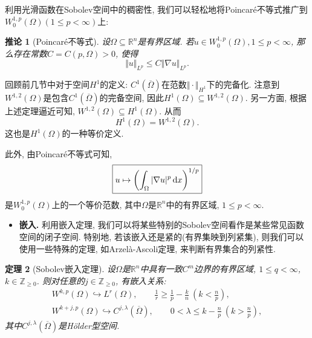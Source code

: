 \documentclass[12pt,a4paper]{article}
\newtheorem{theorem}{定理}[section]
\newtheorem{corollary}[theorem]{推论}
\begin{document}
利用光滑函数在Sobolev空间中的稠密性, 我们可以轻松地将Poincar\'e不等式推广到$W_0^{1, p}(\Omega) (1 \leq p < \infty)$上:

\begin{corollary}[Poincaré不等式]
    设$\Omega \subseteq \mathbb{R}^n$是有界区域. 若$u \in W_0^{1, p}(\Omega), 1 \leq p < \infty$, 那么存在常数$C = C(p, \Omega) > 0$, 使得 
    \begin{equation*}
        \Vert u \Vert_{L^p} \leq C\Vert \nabla u \Vert_{L^p}.
    \end{equation*}
\end{corollary}

回顾前几节中对于空间$H^1$的定义: $C^1(\overline{\Omega})$在范数$\Vert \cdot \Vert_{H^1}$下的完备化.
注意到$W^{1, 2}(\Omega)$是包含$C^1(\overline{\Omega})$的完备空间, 因此$H^1(\Omega) \subseteq W^{1, 2}(\Omega)$.
另一方面, 根据上述定理逼近可知, $W^{1, 2}(\Omega) \subseteq H^1(\Omega)$. 从而
\begin{equation*}
    \boxed{H^1(\Omega) = W^{1, 2}(\Omega).}
\end{equation*} 
这也是$H^1(\Omega)$的一种等价定义.

此外, 由Poincaré不等式可知, 
\begin{equation*}
    \boxed{u \mapsto \left(\int_{\Omega}|\nabla u|^p \,{\rm d}x\right)^{1/p}}
\end{equation*}
是$W_0^{1, p}(\Omega)$上的一个等价范数, 其中$\Omega$是$\mathbb{R}^n$中的有界区域, $1 \leq p < \infty$.

\begin{itemize}
    \item \textbf{嵌入.} 利用嵌入定理, 我们可以将某些特别的Sobolev空间看作是某些常见函数空间的闭子空间.
    特别地, 若该嵌入还是紧的(有界集映到列紧集), 则我们可以使用一些特殊的定理, 如Arzelà-Ascoli定理, 来判断有界集合的列紧性.
\end{itemize}

\begin{theorem}[Sobolev嵌入定理]
    设$\Omega$是$\mathbb{R}^n$中具有一致$C^m$边界的有界区域, $1 \leq q < \infty$, $k \in \mathbb{Z}_{\geq 0}$.
    则对任意的$j \in \mathbb{Z}_{\geq 0}$, 有嵌入关系:
    \begin{gather*}
        W^{k, p}(\Omega) \hookrightarrow L^r(\Omega), \qquad \frac{1}{r} \geq \frac{1}{p} - \frac{k}{n}\ \left(k < \frac{n}{p}\right), \\
        W^{k + j, p}(\Omega) \hookrightarrow C^{j, \lambda}(\overline{\Omega}), \qquad 0 < \lambda \leq k - \frac{n}{p}\ \left(k > \frac{n}{p}\right),
    \end{gather*}
    其中$C^{j, \lambda}(\overline{\Omega})$是H\"older型空间.
\end{theorem}
\end{document}
